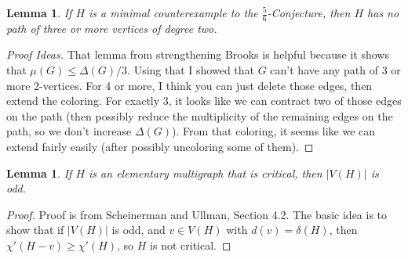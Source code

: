 \documentclass[12pt]{amsart}
\theoremstyle{plain}
\newtheorem{lem}[thm]{Lemma}
\theoremstyle{definition}
\theoremstyle{remark}
\begin{document}
\begin{lem}
If $H$ %
is a minimal counterexample to the $\frac56$-Conjecture, then $H$ has no
path of three or more vertices of degree two.
\label{no3path}
\end{lem}
\begin{proof}[Proof Ideas]
That lemma from strengthening Brooks is
helpful because it shows that $\mu(G) \le \Delta(G)/3$.  Using that I
showed that $G$ can't have any path of 3 or more 2-vertices.  For 4 or
more, I think you can just delete those edges, then extend the
coloring.  For exactly 3, it looks like we can contract two of those
edges on the path (then possibly reduce the multiplicity of the
remaining edges on the path, so we don't increase $\Delta(G)$). 
From that coloring, it seems like we can extend fairly easily
(after possibly uncoloring some of them).
\end{proof}

\begin{lem}
If $H$ is an elementary multigraph that is critical, then $|V(H)|$ is odd.
\label{elem-odd}
\end{lem}
\begin{proof}
Proof is from Scheinerman and Ullman, Section 4.2.  The basic idea is to show
that if $|V(H)|$ is odd, and $v\in V(H)$ with $d(v)=\delta(H)$, then
$\chi'(H-v)\ge \chi'(H)$, so $H$ is not critical.
\end{proof}
\end{document}
